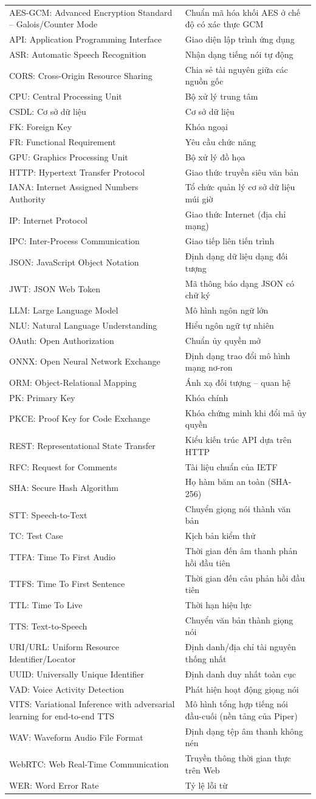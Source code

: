 \newcommand{\abbr}[3]{#1: #2 & #3\\}
\small
\begin{longtable}{@{}L{0.52\textwidth}L{0.44\textwidth}@{}}
\abbr{AES-GCM}{Advanced Encryption Standard – Galois/Counter Mode}{Chuẩn mã hóa khối AES ở chế độ có xác thực GCM}
\abbr{API}{Application Programming Interface}{Giao diện lập trình ứng dụng}
\abbr{ASR}{Automatic Speech Recognition}{Nhận dạng tiếng nói tự động}
\abbr{CORS}{Cross-Origin Resource Sharing}{Chia sẻ tài nguyên giữa các nguồn gốc}
\abbr{CPU}{Central Processing Unit}{Bộ xử lý trung tâm}
\abbr{CSDL}{Cơ sở dữ liệu}{Cơ sở dữ liệu}
\abbr{FK}{Foreign Key}{Khóa ngoại}
\abbr{FR}{Functional Requirement}{Yêu cầu chức năng}
\abbr{GPU}{Graphics Processing Unit}{Bộ xử lý đồ họa}
\abbr{HTTP}{Hypertext Transfer Protocol}{Giao thức truyền siêu văn bản}
\abbr{IANA}{Internet Assigned Numbers Authority}{Tổ chức quản lý cơ sở dữ liệu múi giờ}
\abbr{IP}{Internet Protocol}{Giao thức Internet (địa chỉ mạng)}
\abbr{IPC}{Inter-Process Communication}{Giao tiếp liên tiến trình}
\abbr{JSON}{JavaScript Object Notation}{Định dạng dữ liệu dạng đối tượng}
\abbr{JWT}{JSON Web Token}{Mã thông báo dạng JSON có chữ ký}
\abbr{LLM}{Large Language Model}{Mô hình ngôn ngữ lớn}
\abbr{NLU}{Natural Language Understanding}{Hiểu ngôn ngữ tự nhiên}
\abbr{OAuth}{Open Authorization}{Chuẩn ủy quyền mở}
\abbr{ONNX}{Open Neural Network Exchange}{Định dạng trao đổi mô hình mạng nơ-ron}
\abbr{ORM}{Object-Relational Mapping}{Ánh xạ đối tượng – quan hệ}
\abbr{PK}{Primary Key}{Khóa chính}
\abbr{PKCE}{Proof Key for Code Exchange}{Khóa chứng minh khi đổi mã ủy quyền}
\abbr{REST}{Representational State Transfer}{Kiểu kiến trúc API dựa trên HTTP}
\abbr{RFC}{Request for Comments}{Tài liệu chuẩn của IETF}
\abbr{SHA}{Secure Hash Algorithm}{Họ hàm băm an toàn (SHA-256)}
\abbr{STT}{Speech-to-Text}{Chuyển giọng nói thành văn bản}
\abbr{TC}{Test Case}{Kịch bản kiểm thử}
\abbr{TTFA}{Time To First Audio}{Thời gian đến âm thanh phản hồi đầu tiên}
\abbr{TTFS}{Time To First Sentence}{Thời gian đến câu phản hồi đầu tiên}
\abbr{TTL}{Time To Live}{Thời hạn hiệu lực}
\abbr{TTS}{Text-to-Speech}{Chuyển văn bản thành giọng nói}
\abbr{URI/URL}{Uniform Resource Identifier/Locator}{Định danh/địa chỉ tài nguyên thống nhất}
\abbr{UUID}{Universally Unique Identifier}{Định danh duy nhất toàn cục}
\abbr{VAD}{Voice Activity Detection}{Phát hiện hoạt động giọng nói}
\abbr{VITS}{Variational Inference with adversarial learning for end-to-end TTS}{Mô hình tổng hợp tiếng nói đầu-cuối (nền tảng của Piper)}
\abbr{WAV}{Waveform Audio File Format}{Định dạng tệp âm thanh không nén}
\abbr{WebRTC}{Web Real-Time Communication}{Truyền thông thời gian thực trên Web}
\abbr{WER}{Word Error Rate}{Tỷ lệ lỗi từ}
\end{longtable}
\normalsize
\clearpage
